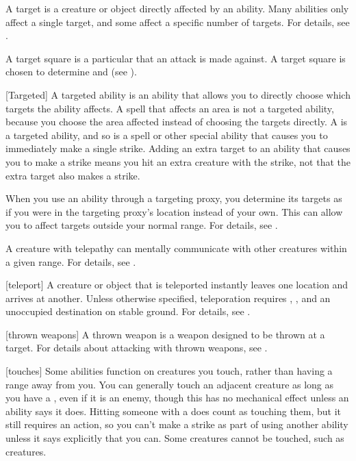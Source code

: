  A target is a creature or object directly affected by an ability.
Many abilities only affect a single target, and some affect a specific number of targets.
For details, see .

 A target square is a particular  that an attack is made against.
A target square is chosen to determine  and  (see ).

[Targeted] A targeted ability is an ability that allows you to directly choose which targets the ability affects.
A spell that affects an area is not a targeted ability, because you choose the area affected instead of choosing the targets directly.
A  is a targeted ability, and so is a spell or other special ability that causes you to immediately make a single strike.
Adding an extra target to an ability that causes you to make a strike means you hit an extra creature with the strike, not that the extra target also makes a strike.

 When you use an ability through a targeting proxy, you determine its targets as if you were in the targeting proxy's location instead of your own.
This can allow you to affect targets outside your normal range.
For details, see .

 A creature with telepathy can mentally communicate with other creatures within a given range.
For details, see .

[teleport] A creature or object that is teleported instantly leaves one location and arrives at another.
Unless otherwise specified, teleporation requires , , and an unoccupied destination on stable ground.
For details, see .

[thrown weapons] A thrown weapon is a weapon designed to be thrown at a target.
For details about attacking with thrown weapons, see .

[touches] Some abilities function on creatures you touch, rather than having a range away from you.
You can generally touch an adjacent creature as long as you have a , even if it is an enemy, though this has no mechanical effect unless an ability says it does.
Hitting someone with a  does count as touching them, but it still requires an action, so you can't make a strike as part of using another ability unless it says explicitly that you can.
Some creatures cannot be touched, such as  creatures.

